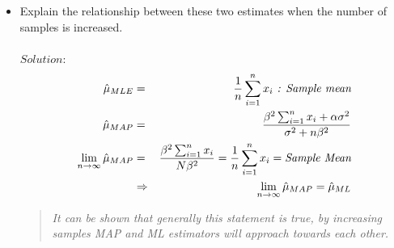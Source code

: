 \documentclass[a4paper]{article}
\begin{document}
\begin{itemize}
        \begin{eqnarray*}
            \mu_{prior} \sim \mathcal{N}(\alpha,\,\beta^{2}) &\Rightarrow& {f_U}(\mu) = \frac{1}{2\pi \beta}exp(-\frac{(\mu - \alpha)^2}{2{\beta^2}}) \\
            \hat{\mu}_{MAP} &=& arg max_\mu {} L(\mu, \sigma^2; {x_1}, {x_2}, ..., {x_n}){f_U}(\mu)\\
            \hat{\mu}_{MAP} = arg max_\mu Ln(L(\mu, \sigma^2; {x_1}, {x_2}, ..., {x_n}){f_U}(\mu)) &=& arg max_\mu [Ln(L(\mu, \sigma^2; {x_1}, {x_2}, ..., {x_n}) + Ln({f_U}(\mu))] \\
            Ln(L(\mu, \sigma^2; {x_1}, {x_2}, ..., {x_n}){f_U}(\mu))  &=& -\frac{N}{2} Ln(2\pi) - NLn(\sigma) - \sum_{i=1}^n \frac{({x_i - \mu})^2}{2\sigma^2}\\
            -\frac{1}{2}Ln(2\pi) - Ln(\beta) - (\frac{(\mu - \alpha)^2}{2\beta^2}) &=& H(\mu, \sigma^2; {x_1}, {x_2}, ..., {x_n}) \\
            &\Rightarrow& \frac{\partial}{\partial \mu}H(\mu, \sigma^2; {x_1}, {x_2}, ..., {x_n})  = 0 \\
            &\Rightarrow& \frac{1}{\sigma^2} \sum_{i=1}^N ({x_i} - \hat{\mu}_{MAP}) - \frac{1}{\beta^2}(\hat{\mu}_{MAP} - \alpha) = 0 \\
            \Rightarrow \hat{\mu}_{MAP} = \frac{\frac{1}{\sigma^2} \sum_{i=1}^n {x_i} + \frac{\alpha}{\beta^2}}{\frac{\sigma^2 + N\beta^2}{(\sigma \beta)^2}} &=& \frac{\beta^2 \sum_{i=1}^n {x_i} + \alpha{\sigma^2}}{\sigma^2 + n\beta^2}
        \end{eqnarray*}
        \vspace*{6\baselineskip}
        \item Explain the relationship between these two estimates when the number of samples is increased.\\
        \\
        $Solution:$ \\
        \begin{eqnarray*}
            \hat{\mu}_{MLE} &=& \frac{1}{n} \sum_{i=1}^n {x_i}\emph{ : Sample mean}\\
            \hat{\mu}_{MAP} &=& \frac{\beta^2 \sum_{i=1}^n {x_i} + \alpha{\sigma^2}}{\sigma^2 + n\beta^2}\\
            \lim_{n\to\infty} \hat{\mu}_{MAP} &=& \frac{\beta^2 \sum_{i=1}^n {x_i}}{N\beta^2} = \frac{1}{n} \sum_{i=1}^n {x_i} = \emph{Sample Mean} \\
            &\Rightarrow& \lim_{n\to\infty} \hat{\mu}_{MAP} = \hat{\mu}_{ML} 
        \end{eqnarray*}
        \begin{quote}
            \emph{It can be shown that generally this statement is true, by increasing samples MAP and ML estimators will approach towards each other.}
        \end{quote}
        \end{itemize}
\end{document}
